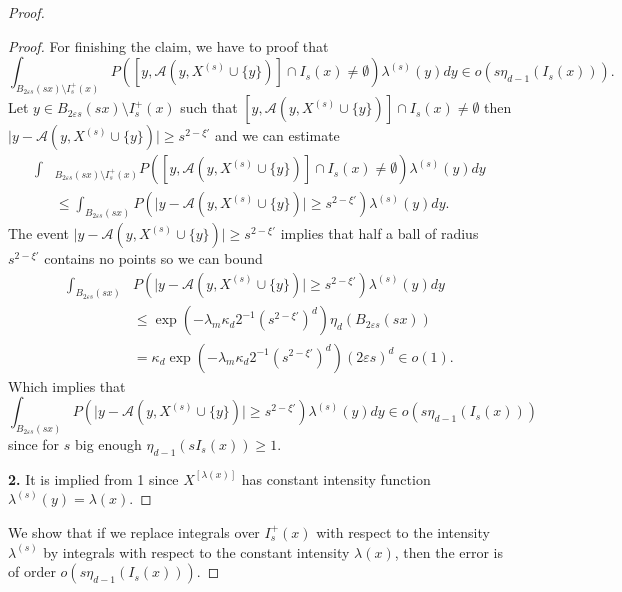 \begin{proof}
\begin{proof}
For finishing the claim, we have to proof that
 $$\int_{B_{2\varepsilon s}(sx)\setminus I^+_s(x)}P([y, \mathcal{A}(y,X^{(s)}\cup\lbrace y\rbrace)]\cap I_s(x)\neq \emptyset)\lambda^{(s)}(y)dy\in o(s\eta_{d-1}(I_s(x))).$$ Let $y\in B_{2\varepsilon s}(sx)\setminus I^+_s(x)$ such that $[y, \mathcal{A}(y,X^{(s)}\cup\lbrace y\rbrace)]\cap I_s(x)\neq \emptyset$ then $\vert y-\mathcal{A}(y,X^{(s)}\cup\lbrace y\rbrace)\vert\geq s^{2-\xi'} $ and we can estimate
\begin{align}
\int&_{B_{2\varepsilon s}(sx)\setminus I^+_s(x)}P([y, \mathcal{A}(y,X^{(s)}\cup\lbrace y\rbrace)]\cap I_s(x)\neq \emptyset)\lambda^{(s)}(y)dy\nonumber\\
&\leq \int_{B_{2\varepsilon s}(sx)}P(\vert y-\mathcal{A}(y,X^{(s)}\cup\lbrace y\rbrace)\vert\geq s^{2-\xi'})\lambda^{(s)}(y)dy\nonumber.
\end{align}
The event $\vert y-\mathcal{A}(y,X^{(s)}\cup\lbrace y\rbrace)\vert\geq s^{2-\xi'}$ implies that half a ball of radius $s^{2-\xi'}$ contains no points so we can bound
\begin{align}
\int_{B_{2\varepsilon s}(sx)}&P(\vert y-\mathcal{A}(y,X^{(s)}\cup\lbrace y\rbrace)\vert\geq s^{2-\xi'})\lambda^{(s)}(y)dy\nonumber\\
&\leq\exp(-\lambda_m\kappa_d2^{-1}(s^{2-\xi'})^d)\eta_{d}(B_{2\varepsilon s}(sx))\nonumber\\
&=\kappa_d\exp(-\lambda_m\kappa_d2^{-1}(s^{2-\xi'})^d)(2\varepsilon s)^{d}\in o(1).\nonumber
\end{align}
Which implies that 
$$\int_{B_{2\varepsilon s}(sx)}P(\vert y-\mathcal{A}(y,X^{(s)}\cup\lbrace y\rbrace)\vert\geq s^{2-\xi'})\lambda^{(s)}(y)dy\in o(s\eta_{d-1}(I_s(x))) $$ since for $s$ big enough $\eta_{d-1}(s I_s(x))\geq 1$.

\textbf{2.} It is implied from 1 since $X^{[\lambda(x)]}$ has constant intensity function $\lambda^{(s)}(y)=\lambda(x)$.
\end{proof}

We show that if we replace integrals over $I^+_s(x)$ with respect to the intensity $\lambda^{(s)}$ by integrals with respect to the constant intensity $\lambda(x)$, then the error is of order $o(s\eta_{d-1}(I_s(x)))$.


\end{proof}
